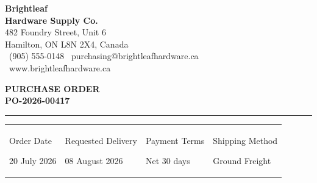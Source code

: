 \documentclass[11pt]{article}
\newcommand{\infoline}[2]{%
  {\color{midgray}\small #1}\par
  \vspace{-0.5mm}
  {#2}\par
  \vspace{1mm}
}
\begin{document}
\thispagestyle{empty}

\begin{minipage}[t]{0.55\linewidth}
  {\Huge\bfseries\color{accent}Brightleaf}\\[0.5mm]
  {\Large\bfseries\color{accent2}Hardware Supply Co.}\\[3mm]
  {\small\color{midgray}
  482 Foundry Street, Unit 6\\
  Hamilton, ON L8N 2X4, Canada\\
  \faPhone\ (905) 555-0148 \quad \faEnvelope\ purchasing@brightleafhardware.ca\\
  \faGlobe\ www.brightleafhardware.ca}
\end{minipage}%
\hfill
\begin{minipage}[t]{0.4\linewidth}
  \begin{tcolorbox}[
    colback=accent,
    colframe=accent,
    arc=1.5mm,
    left=4mm, right=4mm, top=3mm, bottom=3mm,
    ]
    \begin{center}
      {\color{white}\Large\bfseries PURCHASE ORDER}\\[1.5mm]
      {\color{accent2}\Huge\bfseries PO-2026-00417}
    \end{center}
  \end{tcolorbox}
\end{minipage}

\vspace{3mm}
{\color{rulegray}\hrule height 1pt}
\vspace{4mm}

\begin{tabularx}{\linewidth}{Y Y Y Y}
\infoline{Order Date}{20 July 2026} &
\infoline{Requested Delivery}{08 August 2026} &
\infoline{Payment Terms}{Net 30 days} &
\infoline{Shipping Method}{Ground Freight}
\end{tabularx}

\vspace{1mm}
\end{document}
